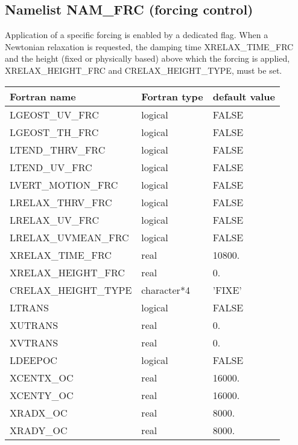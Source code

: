 \subsection{Namelist NAM\_FRC (forcing control)}

Application of a specific forcing is enabled by a dedicated flag. When a
Newtonian relaxation is requested, the damping time XRELAX\_TIME\_FRC and the
height (fixed or physically based) above which the forcing is applied,
XRELAX\_HEIGHT\_FRC and CRELAX\_HEIGHT\_TYPE, must be set.

\begin{center}
\begin{tabular} {|l|l|l|}
\hline
Fortran name & Fortran type & default value \\
\hline
LGEOST\_UV\_FRC      & logical      & FALSE \\
LGEOST\_TH\_FRC      & logical      & FALSE \\
LTEND\_THRV\_FRC     & logical      & FALSE \\
LTEND\_UV\_FRC       & logical      & FALSE \\
LVERT\_MOTION\_FRC   & logical      & FALSE \\
LRELAX\_THRV\_FRC    & logical      & FALSE \\
LRELAX\_UV\_FRC      & logical      & FALSE \\
LRELAX\_UVMEAN\_FRC  & logical      & FALSE \\
XRELAX\_TIME\_FRC    & real         & 10800. \\
XRELAX\_HEIGHT\_FRC  & real         & 0. \\
CRELAX\_HEIGHT\_TYPE & character*4  & 'FIXE' \\
LTRANS               & logical      & FALSE \\
XUTRANS              & real         & 0. \\
XVTRANS              & real         & 0. \\
LDEEPOC              & logical      & FALSE \\
XCENTX\_OC            & real         & 16000. \\
XCENTY\_OC            & real         & 16000. \\
XRADX\_OC             & real         & 8000. \\
XRADY\_OC             & real         & 8000. \\
\hline
\end{tabular}
\end{center}

